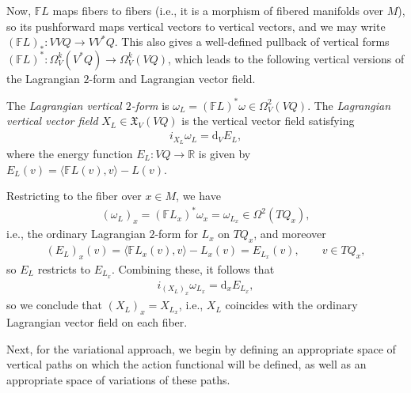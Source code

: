 \documentclass[pdftex]{sigma}
\numberwithin{equation}{section}
\begin{document}
Now, $ \mathbb{F} L $ maps f\/ibers to f\/ibers (i.e., it is a morphism of f\/ibered manifolds over $M$), so its pushforward maps vertical vectors
to vertical vectors, and we may write $( \mathbb{F} L ) _\ast \colon V V Q \rightarrow V V ^\ast Q $. This also gives a well-def\/ined pullback of vertical forms $ ( \mathbb{F} L ) ^\ast \colon \Omega ^k _V ( V ^\ast Q ) \rightarrow \Omega ^k _V ( V Q ) $, which leads to the following vertical versions of the Lagrangian $2$-form and Lagrangian vector f\/ield.

\begin{Definition} The \emph{Lagrangian vertical $2$-form} is $ \omega _L = ( \mathbb{F} L ) ^\ast \omega \in \Omega ^2 _V ( V Q )
 $. The \emph{Lagrangian vertical vector field} $ X _L \in \mathfrak{X} _V ( V Q ) $ is the vertical vector f\/ield satisfying
 \begin{gather*}
 i _{ X _L } \omega _L = \mathrm{d} _V E _L ,
 \end{gather*}
where the energy function $ E _L \colon V Q \rightarrow \mathbb{R} $ is given by $E _L (v) = \bigl\langle \mathbb{F} L (v) , v \bigr\rangle - L (v)$.
\end{Definition}

\begin{Remark} Restricting to the f\/iber over $ x \in M $, we have
\begin{gather*}
 ( \omega _L ) _x = ( \mathbb{F} L _x ) ^\ast \omega _x = \omega _{L _x} \in \Omega ^2 ( T Q _x ) ,
\end{gather*}
i.e., the ordinary Lagrangian $2$-form for $ L _x $ on $ T Q _x $, and moreover
\begin{gather*}
 ( E _L ) _x (v) = \bigl\langle \mathbb{F} L _x (v) , v \bigr\rangle- L _x (v) = E _{ L _x } (v) , \qquad v \in T Q _x ,
\end{gather*}
so $ E _L $ restricts to $ E _{ L _x } $. Combining these, it follows that
\begin{gather*}
 i _{ (X _L) _x } \omega _{ L _x } = \mathrm{d} _x E _{ L _x } ,
\end{gather*}
so we conclude that $ ( X _L ) _x = X _{ L _x } $, i.e., $ X _L $ coincides with the ordinary Lagrangian vector f\/ield on each f\/iber.
\end{Remark}

Next, for the variational approach, we begin by def\/ining an appropriate space of vertical paths on which the action functional will be def\/ined, as well as an appropriate space of variations of these paths.
\end{document}
